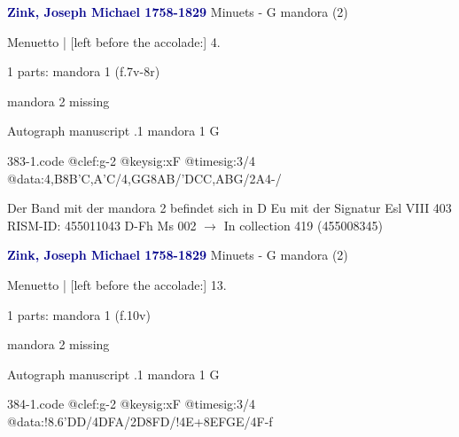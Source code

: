 \documentclass[twocolumn]{book}
\begin{document}
\newline \par \vspace{7pt} \textcolor{darkblue}{\textbf{Zink, Joseph Michael  1758-1829}}
\newline Minuets - G
\newline mandora (2)
\newline \begin{itshape}[f.7v, at left:] Menuetto | [left before the accolade:] 4.\end{itshape} 
\newline \textcolor{darkblue}{}  1 parts: mandora 1  (f.7v-8r)
\newline \begin{small} mandora 2 missing\end{small} 
\newline Autograph manuscript
.1  mandora 1  G  
\begin{filecontents*}{383-1.code}
@clef:g-2
@keysig:xF
@timesig:3/4
@data:4,B8B'C,A'C/4,GG{8AB}/'DCC,ABG/2A4-/
\end{filecontents*}
\newline
%

\newline Der Band mit der mandora 2 befindet sich in D Eu mit der Signatur Esl VIII 403
\newline RISM-ID: 455011043
\newline D-Fh  Ms 002
\newline $\rightarrow$ In collection 419 (455008345)
      
\newline \par \vspace{7pt} \textcolor{darkblue}{\textbf{Zink, Joseph Michael  1758-1829}}
\newline Minuets - G
\newline mandora (2)
\newline \begin{itshape}[f.10v, at left:] Menuetto | [left before the accolade:] 13.\end{itshape} 
\newline \textcolor{darkblue}{}  1 parts: mandora 1  (f.10v)
\newline \begin{small} mandora 2 missing\end{small} 
\newline Autograph manuscript
.1  mandora 1  G  
\begin{filecontents*}{384-1.code}
@clef:g-2
@keysig:xF
@timesig:3/4
@data:!{8.6'DD}/4DFA/2D{8FD}/!4E+{8EFGE}/4F-f
\end{filecontents*}
\newline
%
\end{document}
